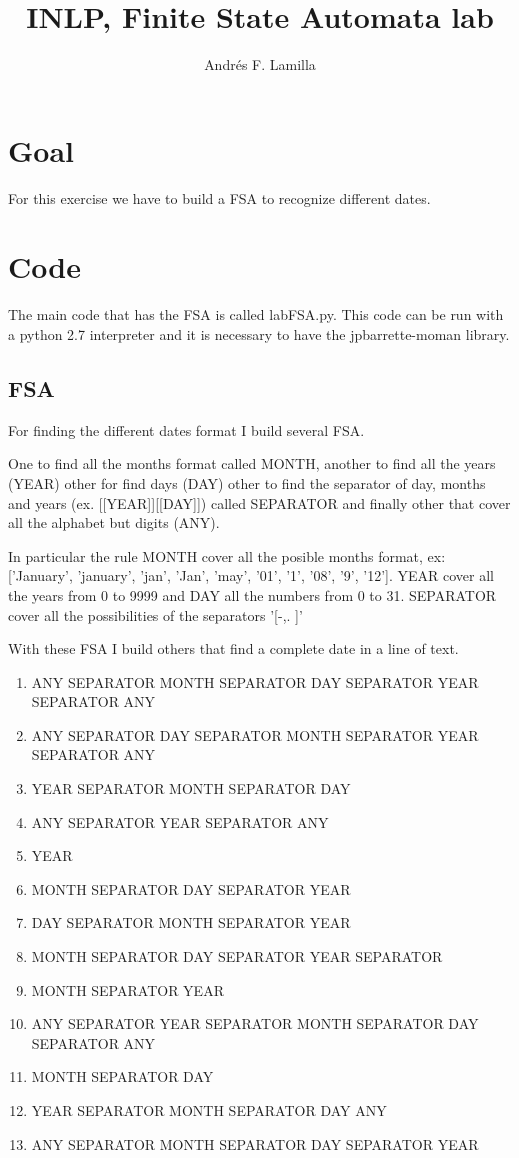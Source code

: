 \documentclass[letterpaper]{article}
\title{INLP, Finite State Automata lab}
\author{Andrés F. Lamilla}
\begin{document}
\maketitle
\tableofcontents
\newpage
\section{Goal}
For this exercise we have to build a FSA to recognize different dates.

\section{Code}
The main code that has the FSA is called labFSA.py. This code can be run with a python 2.7 interpreter and it is necessary to have the jpbarrette-moman library.

\subsection{FSA}
For finding the different dates format I build several FSA.

One to find all the months format called MONTH, another to find all the years (YEAR) other for find days (DAY) other to find the separator of day, months and years (ex. [[YEAR]][[DAY]]) called SEPARATOR and finally other that cover all the alphabet but digits (ANY).

In particular the rule MONTH cover all the posible months format, ex: ['January', 'january', 'jan', 'Jan', 'may', '01', '1', '08', '9', '12']. YEAR cover all the years from 0 to 9999 and DAY all the numbers from 0 to 31. SEPARATOR cover all the possibilities of the separators '[-,. ]'

With these FSA I build others that find a complete date in a line of text.

\begin{enumerate}
    \item ANY SEPARATOR MONTH SEPARATOR DAY SEPARATOR YEAR SEPARATOR ANY
    \item ANY SEPARATOR DAY SEPARATOR MONTH SEPARATOR YEAR SEPARATOR ANY
    \item YEAR SEPARATOR MONTH SEPARATOR DAY
    \item ANY SEPARATOR YEAR SEPARATOR ANY
    \item YEAR
    \item MONTH SEPARATOR DAY SEPARATOR YEAR
    \item DAY SEPARATOR MONTH SEPARATOR YEAR
    \item MONTH SEPARATOR DAY SEPARATOR YEAR SEPARATOR
    \item MONTH SEPARATOR YEAR
    \item ANY SEPARATOR YEAR SEPARATOR MONTH SEPARATOR DAY SEPARATOR ANY
    \item MONTH SEPARATOR DAY
    \item YEAR SEPARATOR MONTH SEPARATOR DAY ANY
    \item ANY SEPARATOR MONTH SEPARATOR DAY SEPARATOR YEAR
\end{enumerate}
\end{document}
